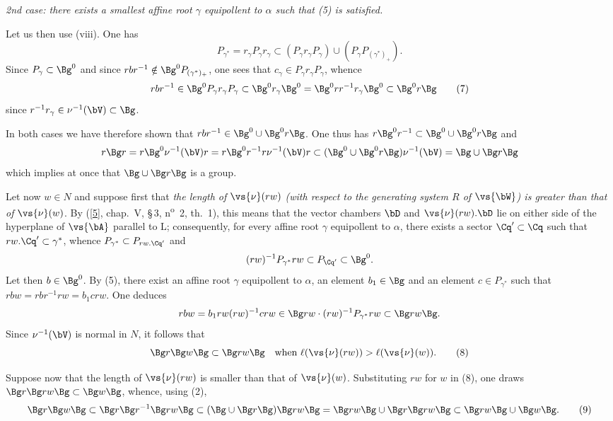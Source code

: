 \documentclass[12pt,a4paper,oneside,english]{smfart}
\newcommand{\btbib}[1]{\hyperlink{bib:#1}{#1}}
\theoremstyle{definition}
\theoremstyle{bt}
\begin{document}
\smallskip
\noindent
\emph{2nd case: there exists a smallest affine root $\gamma$ equipollent to
$\alpha$ such that \textup{(5)} is satisfied.}

Let us then use (viii). One has
\begin{equation*}
P_{\gamma^{*}}=r_{\gamma}P_{\gamma}r_{\gamma}
\subset(P_{\gamma}r_{\gamma}P_{\gamma})\cup(P_{\gamma}P_{(\gamma^{*})_{+}}).\tag{6}
\end{equation*}
Since $P_{\gamma}\subset\Bg^{0}$ and since
$rbr^{-1}\notin\Bg^{0}P_{(\gamma^{*})_{+}}$, one sees that
$c_{\gamma}\in P_{\gamma}r_{\gamma}P_{\gamma}$, whence
\begin{equation*}
rbr^{-1}\in\Bg^{0}P_{\gamma}r_{\gamma}P_{\gamma}
\subset\Bg^{0}r_{\gamma}\Bg^{0}=\Bg^{0}rr^{-1}r_{\gamma}\Bg^{0}\subset\Bg^{0}r\Bg
\tag{7}
\end{equation*}
since $r^{-1}r_{\gamma}\in\nu^{-1}(\bV)\subset\Bg$.

In both cases we have therefore shown that
$rbr^{-1}\in\Bg^{0}\cup\Bg^{0}r\Bg$. One thus has
$r\Bg^{0}r^{-1}\subset\Bg^{0}\cup\Bg^{0}r\Bg$ and
\[
r\Bg r=r\Bg^{0}\nu^{-1}(\bV)r=r\Bg^{0}r^{-1}r\nu^{-1}(\bV)r
\subset(\Bg^{0}\cup\Bg^{0}r\Bg)\nu^{-1}(\bV)=\Bg\cup\Bg r\Bg
\]
which implies at once that $\Bg\cup\Bg r\Bg$ is a group.

Let now $w\in N$ and suppose first that \emph{the length of $\vs{\nu}(rw)$
(with respect to the generating system $R$ of $\vs{\bW}$) is greater than that
of $\vs{\nu}(w)$}. By ([\btbib{5}], chap.~V, \S\,3, n\textsuperscript{o}~2, th.~1), this
means that the vector chambers $\bD$ and $\vs{\nu}(rw).\bD$ lie on either side
of the hyperplane of $\vs{\bA}$ parallel to $\mathrm{L}$; consequently, for
every affine root $\gamma$ equipollent to $\alpha$, there exists a sector
$\Cq'\subset\Cq$ such that $rw.\Cq'\subset\gamma^{*}$, whence
$P_{\gamma^{*}}\subset P_{rw.\Cq'}$ and
\[
(rw)^{-1}P_{\gamma^{*}}rw\subset P_{\Cq'}\subset\Bg^{0}.
\]
Let then $b\in\Bg^{0}$. By (5), there exist an affine root $\gamma$ equipollent
to $\alpha$, an element $b_{1}\in\Bg$ and an element $c\in P_{\gamma^{*}}$ such
that $rbw=rbr^{-1}rw=b_{1}crw$. One deduces
\[
rbw=b_{1}rw(rw)^{-1}crw\in\Bg rw\cdot(rw)^{-1}P_{\gamma^{*}}rw\subset\Bg rw\Bg .
\]
Since $\nu^{-1}(\bV)$ is normal in $N$, it follows that
\begin{equation*}
\Bg r\Bg w\Bg\subset\Bg rw\Bg\quad\text{when }
\ell(\vs{\nu}(rw))>\ell(\vs{\nu}(w)).\tag{8}
\end{equation*}

Suppose now that the length of $\vs{\nu}(rw)$ is smaller than that of
$\vs{\nu}(w)$. Substituting $rw$ for $w$ in (8), one draws
$\Bg r\Bg rw\Bg\subset\Bg w\Bg$, whence, using (2),
\begin{equation*}
\Bg r\Bg w\Bg\subset\Bg r\Bg r^{-1}\Bg rw\Bg
\subset(\Bg\cup\Bg r\Bg)\Bg rw\Bg=\Bg rw\Bg\cup\Bg r\Bg rw\Bg
\subset\Bg rw\Bg\cup\Bg w\Bg.\tag{9}
\end{equation*}
\end{document}
